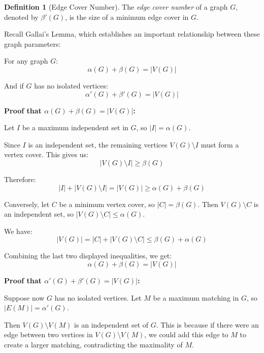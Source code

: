 \documentclass{article}
\theoremstyle{definition}
\newtheorem{definition}{Definition}
\begin{document}
\begin{definition}[Edge Cover Number]
The \emph{edge cover number} of a graph $G$, denoted by $\beta'(G)$, is the size of a minimum edge cover in $G$.
\end{definition}

Recall Gallai's Lemma, which establishes an important relationship between these graph parameters:

For any graph $G$:
\begin{equation}
\alpha(G) + \beta(G) = |V(G)|
\end{equation}

And if $G$ has no isolated vertices:
\begin{equation}
\alpha'(G) + \beta'(G) = |V(G)|
\end{equation}

\textbf{Proof that $\alpha(G) + \beta(G) = |V(G)|$:}

Let $I$ be a maximum independent set in $G$, so $|I| = \alpha(G)$.

Since $I$ is an independent set, the remaining vertices $V(G) \setminus I$ must form a vertex cover. This gives us:
\begin{equation}
|V(G) \setminus I| \geq \beta(G)
\end{equation}

Therefore:
\begin{equation}
|I| + |V(G) \setminus I| = |V(G)| \geq \alpha(G) + \beta(G) 
\end{equation}

Conversely, let $C$ be a minimum vertex cover, so $|C| = \beta(G)$. Then $V(G) \setminus C$ is an independent set, so $|V(G) \setminus C| \leq \alpha(G)$.

We have:
\begin{equation}
|V(G)| = |C| + |V(G) \setminus C| \leq \beta(G) + \alpha(G) 
\end{equation}

Combining the last two displayed inequalities, we get:
\begin{equation}
\alpha(G) + \beta(G) = |V(G)|
\end{equation}

\textbf{Proof that $\alpha'(G) + \beta'(G) = |V(G)|$:}

Suppose now $G$ has no isolated vertices. Let $M$ be a maximum matching in $G$, so $|E(M)| = \alpha'(G)$.

Then $V(G) \setminus V(M)$ is an independent set of $G$. This is because if there were an edge between two vertices in $V(G) \setminus V(M)$, we could add this edge to $M$ to create a larger matching, contradicting the maximality of $M$.
\end{document}
